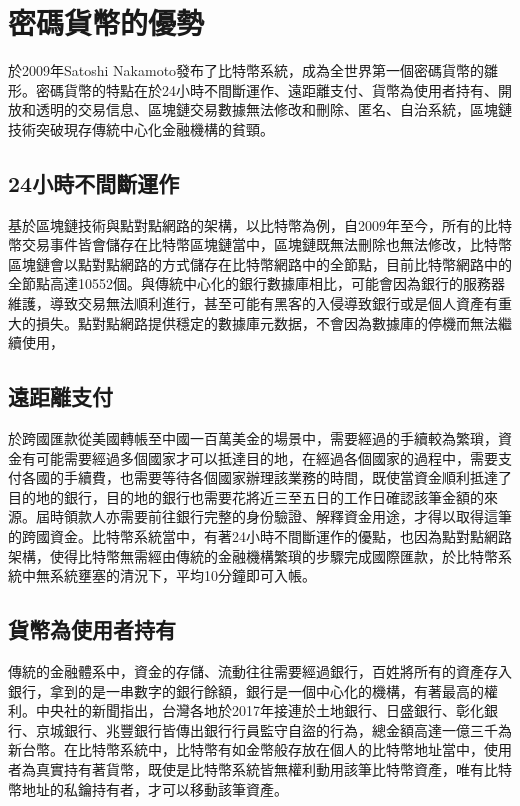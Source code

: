 	\section{密碼貨幣的優勢}
	於2009年Satoshi Nakamoto發布了比特幣系統，成為全世界第一個密碼貨幣的雛形。密碼貨幣的特點在於24小時不間斷運作、遠距離支付、貨幣為使用者持有、開放和透明的交易信息、區塊鏈交易數據無法修改和刪除、匿名、自治系統，區塊鏈技術突破現存傳統中心化金融機構的貧頸。

		\subsection{24小時不間斷運作}
		基於區塊鏈技術與點對點網路的架構，以比特幣為例，自2009年至今，所有的比特幣交易事件皆會儲存在比特幣區塊鏈當中，區塊鏈既無法刪除也無法修改，比特幣區塊鏈會以點對點網路的方式儲存在比特幣網路中的全節點，目前比特幣網路中的全節點高達10552個。與傳統中心化的銀行數據庫相比，可能會因為銀行的服務器維護，導致交易無法順利進行，甚至可能有黑客的入侵導致銀行或是個人資產有重大的損失。點對點網路提供穩定的數據庫元数据，不會因為數據庫的停機而無法繼續使用，
		
		\subsection{遠距離支付}
		於跨國匯款從美國轉帳至中國一百萬美金的場景中，需要經過的手續較為繁瑣，資金有可能需要經過多個國家才可以抵達目的地，在經過各個國家的過程中，需要支付各國的手續費，也需要等待各個國家辦理該業務的時間，既使當資金順利抵達了目的地的銀行，目的地的銀行也需要花將近三至五日的工作日確認該筆金額的來源。屆時領款人亦需要前往銀行完整的身份驗證、解釋資金用途，才得以取得這筆的跨國資金。比特幣系統當中，有著24小時不間斷運作的優點，也因為點對點網路架構，使得比特幣無需經由傳統的金融機構繁瑣的步驟完成國際匯款，於比特幣系統中無系統壅塞的清況下，平均10分鐘即可入帳。

		\subsection{貨幣為使用者持有}
		傳統的金融體系中，資金的存儲、流動往往需要經過銀行，百姓將所有的資產存入銀行，拿到的是一串數字的銀行餘額，銀行是一個中心化的機構，有著最高的權利。中央社的新聞\supercite{Bankguardsstolen}指出，台灣各地於2017年接連於土地銀行、日盛銀行、彰化銀行、京城銀行、兆豐銀行皆傳出銀行行員監守自盜的行為，總金額高達一億三千為新台幣。在比特幣系統中，比特幣有如金幣般存放在個人的比特幣地址當中，使用者為真實持有著貨幣，既使是比特幣系統皆無權利動用該筆比特幣資產，唯有比特幣地址的私鑰持有者，才可以移動該筆資產。

